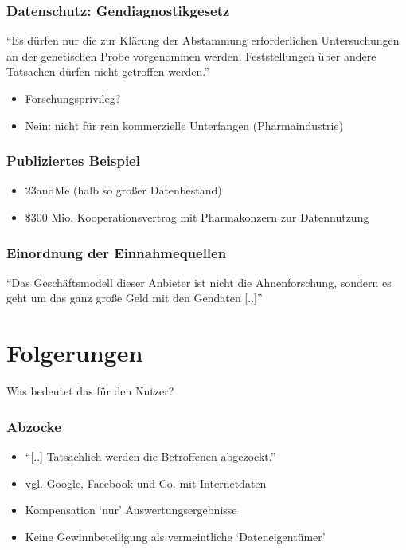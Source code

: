\documentclass{beamer}
\begin{document}
\begin{frame}
  \frametitle{Datenschutz: Gendiagnostikgesetz}

``Es dürfen nur die zur Klärung der Abstammung erforderlichen Untersuchungen an
der genetischen Probe vorgenommen werden. Feststellungen über andere Tatsachen
  dürfen nicht getroffen werden.''\autocite{genDG17}

  \medskip

  \begin{itemize}
    \item Forschungsprivileg?
    \item Nein: nicht für rein kommerzielle Unterfangen (Pharmaindustrie)\autocite{ancestryGER}
  \end{itemize}
\end{frame}

\begin{frame}
  \frametitle{Publiziertes Beispiel\autocite{bigbro}}

  \begin{itemize}
    \item 23andMe (halb so großer Datenbestand)
    \item \$300 Mio. Kooperationsvertrag mit Pharmakonzern zur Datennutzung
  \end{itemize}
\end{frame}

\begin{frame}
  \frametitle{Einordnung der Einnahmequellen}

``Das Geschäftsmodell dieser Anbieter ist nicht die Ahnenforschung, sondern es
geht um das ganz große Geld mit den Gendaten [..]''\autocite{bigbro}
\end{frame}

\section{Folgerungen}
\begin{frame}
  \begin{center}
    {\Huge Was bedeutet das für den Nutzer?}
  \end{center}
\end{frame}

\begin{frame}
  \frametitle{Abzocke\autocite{bigbro}}

  \begin{itemize}
    \item ``[..] Tatsächlich werden die Betroffenen abgezockt.''
    \item vgl. Google, Facebook und Co. mit Internetdaten
    \item Kompensation `nur' Auswertungsergebnisse
    \item Keine Gewinnbeteiligung als vermeintliche `Dateneigentümer'
  \end{itemize}
\end{frame}
\end{document}
